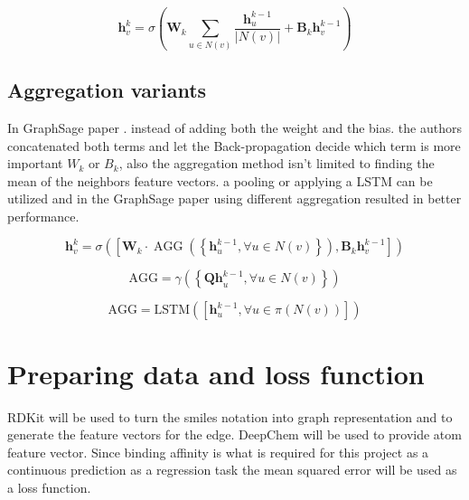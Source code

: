 \documentclass[10pt,twocolumn,letterpaper]{article}
\begin{document}
\begin{equation}
\mathbf{h}_{v}^{k}=\sigma\left(\mathbf{W}_{k} \sum_{u \in N(v)} \frac{\mathbf{h}_{u}^{k-1}}{|N(v)|}+\mathbf{B}_{k} \mathbf{h}_{v}^{k-1}\right)
\end{equation}

 

\subsection{Aggregation variants}

In GraphSage paper \cite{Hamilton2017}. instead of adding both the weight and the bias. the authors concatenated both terms and let the Back-propagation decide which term is more important ${W}_{k}$ or ${B}_{k}$, also the aggregation method isn't limited to finding the mean of the neighbors feature vectors. a pooling or applying a LSTM can be utilized and in the GraphSage paper using different aggregation resulted in better performance.  


\begin{equation}
\mathbf{h}_{v}^{k}=\sigma\left(\left[\mathbf{W}_{k} \cdot \operatorname{AGG}\left(\left\{\mathbf{h}_{u}^{k-1}, \forall u \in N(v)\right\}\right), \mathbf{B}_{k} \mathbf{h}_{v}^{k-1}\right]\right)
\end{equation}

\begin{equation}
\mathrm{AGG}=\gamma\left(\left\{\mathbf{Q h}_{u}^{k-1}, \forall u \in N(v)\right\}\right)
\end{equation}

\begin{equation}
\mathrm{AGG}=\mathrm{LSTM}\left(\left[\mathbf{h}_{u}^{k-1}, \forall u \in \pi(N(v))\right]\right)
\end{equation}


\section{Preparing data and loss function}

RDKit will be used to turn the smiles notation into graph representation and to generate the feature vectors for the edge. DeepChem will be used to provide atom feature vector. Since binding affinity is what is required for this project as a continuous prediction as a regression task the mean squared error will be used as a loss function.




{\small


}
\end{document}
